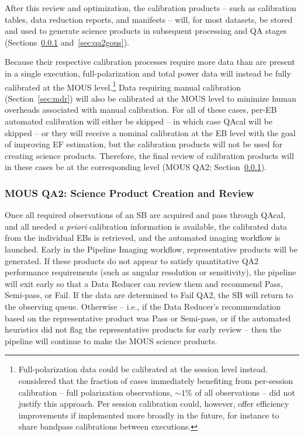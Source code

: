 After this review and optimization, the calibration products -- such as calibration tables, data reduction reports, and manifests -- will, for most datasets, be stored and used to generate science products in subsequent processing and \ac{QA} stages (Sections~\ref{sec:qa2mous} and~\ref{sec:qa2gous}).

Because their respective calibration processes require more data than are present in a single execution,  full-polarization and total power data will instead be fully 
calibrated  at the MOUS level.\footnote{Full-polarization data could be calibrated at the session level instead. \cite{dpomrTsi} considered
that the fraction of cases immediately benefiting from per-session calibration -- full polarization observations, $\sim 1\%$ of all observations -- did not justify this approach. Per session calibration could, however,  offer efficiency improvements if implemented more broadly in the future, for instance to share bandpass calibrations between  executions.} Data requiring manual calibration (Section~\ref{sec:mdr})  will also be  calibrated at the MOUS level to minimize human overheads associated with manual calibration. For all of these cases, per-EB automated calibration will either be skipped -- in which case QAcal will be skipped -- or they will receive a nominal calibration  at the EB level with the 
goal of improving \ac{EF} estimation, but the calibration 
products will not be  used for creating science products.
Therefore, the final review of calibration products will in these cases be at the corresponding level (MOUS QA2; Section~\ref{sec:qa2mous}).


\subsubsection{MOUS QA2: Science Product Creation and Review}
\label{sec:qa2mous}

Once all required observations of an SB are acquired and pass through QAcal, and all needed  {\it a priori} calibration information is available, the calibrated data from the individual EBs is retrieved, and the automated imaging workflow is launched. Early in the Pipeline Imaging workflow, representative products will be generated.  If these products do not appear to satisfy  quantitative QA2 performance requirements (such as angular resolution or sensitivity),  the pipeline will exit early so that a Data Reducer can review them and recommend  Pass,  Semi-pass, or Fail. If the  data are determined to Fail QA2, the SB will return to the observing queue. Otherwise -- i.e., if the Data Reducer's recommendation based on the representative product was Pass or Semi-pass, or if the automated heuristics did not flag the representative products for early review -- then the pipeline will continue to make the  MOUS science products. 

